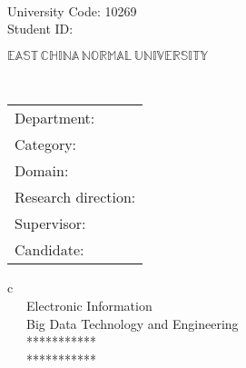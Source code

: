 \newpage

\pagestyle{empty}

\\
\begin{flushright}
 {\large University Code: 10269}\\	
 {\large Student ID: \hide{\stuid}}
\end{flushright}



\vskip 2cm

\begin{center}
{\Huge $\mathbb{EAST}\,\mathbb{CHINA}\,\mathbb{NORMAL}\,
\mathbb{UNIVERSITY}$}
\end{center}

\vskip 3cm

\begin{center}
\bfseries{\scshape{\huge \thesisTitleEn}}\\
\end{center}

\vskip 2.5cm {\large
\begin{center}
\begin{tabular}{l}
Department:\\
Category:\\
Domain:\\
Research direction:\\
Supervisor:\\
Candidate:
\end{tabular}
\begin{tabular}c
~~~\schoolEn  \\
\hline ~~~Electronic Information\\
\hline ~~~Big Data Technology and Engineering\\
\hline ~~~***********\\ 
\hline ~~~***********\\ 
\hline ~~~  \hide{\authornameEn}\\
\hline
\end{tabular}
\end{center}}

\vskip 25mm

\begin{center}
{}
\end{center}
